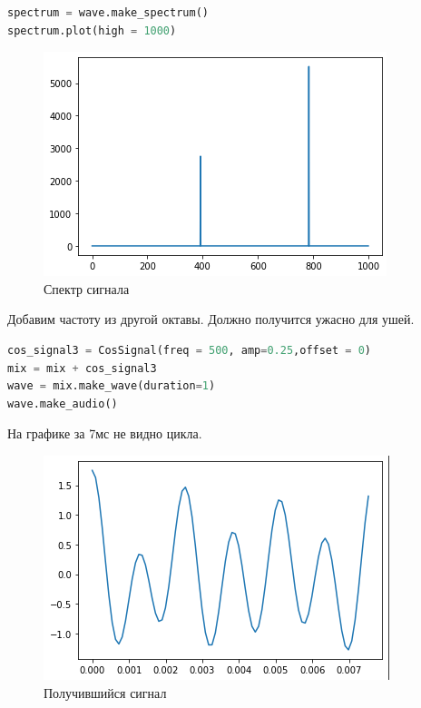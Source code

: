\begin{lstlisting}[language=Python]
spectrum = wave.make_spectrum()
spectrum.plot(high = 1000)
\end{lstlisting}

\begin{figure}[H]
	\begin{center}
		\includegraphics[scale=1]{fig/lab01/lab1_9.png}
		\caption{Спектр сигнала}
	\end{center}
\end{figure}

Добавим частоту из другой октавы. Должно получится ужасно для ушей.

\begin{lstlisting}[language=Python]
cos_signal3 = CosSignal(freq = 500, amp=0.25,offset = 0)
mix = mix + cos_signal3
wave = mix.make_wave(duration=1)
wave.make_audio()
\end{lstlisting}

На графике за 7мс не видно цикла.
\begin{figure}[H]
	\begin{center}
		\includegraphics[scale=1]{fig/lab01/lab1_10.png}
		\caption{Получившийся сигнал}
	\end{center}
\end{figure}

